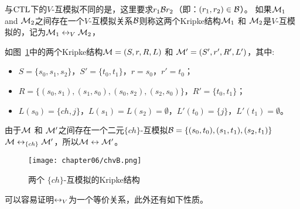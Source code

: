与$\textrm{CTL}$下的$V$-互模拟不同的是，这里要求$r_1 {\cal B} r_2$（即：$(r_1,r_2)\in {\cal B}$）。
如果${\cal M}_1$ and ${\cal M}_2$之间存在一个$V$-互模拟关系${\cal B}$则称这两个Kripke结构${\cal M}_1$ 和 ${\cal M}_2$是$V$-互模拟的，记为${\cal M}_1 \leftrightarrow_V {\cal M}_2$，
\begin{example}
	如图~\ref{chapter06:fig:bisim}中的两个Kripke结构${\cal M}=(S,r,R,L)$ 和 ${\cal M}'=(S',r',R',L')$，其中:
	\begin{itemize}
		\item $S=\{s_0,s_1,s_2\}$，$S'=\{t_0,t_1\}$，$r=s_0$，$r'=t_0$；
		\item $R=\{(s_0,s_1),(s_1,s_0),(s_0,s_2),(s_2,s_0)\}$，$R'=\{t_0,t_1\}$；
		\item $L(s_0)=\{ch,j\}$，$L(s_1)=L(s_2)=\emptyset$，$L'(t_0)=\{j\}$，$L'(t_1)=\emptyset$。
	\end{itemize}
	由于${\cal M}$ 和 ${\cal M}'$之间存在一个二元$\{ch\}$-互模拟${\cal B}=\{(s_0, t_0), (s_1, t_1), (s_2, t_1)\}$ ${\cal M} \leftrightarrow_{\{ch\}} {\cal M}'$，所以${\cal M}\leftrightarrow {\cal M}'$。
	
	
	
	
	\begin{figure}[h]%
		\centering
		\texttt{[image: chapter06/chvB.png]}
		\caption{两个 $\{ch\}$-互模拟的Kripke结构}\label{chapter06:fig:bisim}
		
	\end{figure}
	
\end{example}

可以容易证明$\leftrightarrow_V$为一个等价关系，此外还有如下性质。

